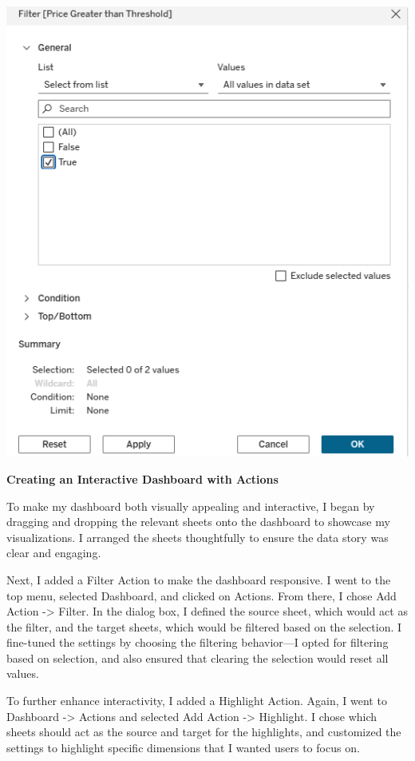 \documentclass[
  letterpaper,
  DIV=11,
  numbers=noendperiod]{scrreprt}
\begin{document}
\includegraphics{Filters_Step2_Shelf_Olufawo.png}

\textbf{Creating an Interactive Dashboard with Actions}

To make my dashboard both visually appealing and interactive, I began by
dragging and dropping the relevant sheets onto the dashboard to showcase
my visualizations. I arranged the sheets thoughtfully to ensure the data
story was clear and engaging.

Next, I added a Filter Action to make the dashboard responsive. I went
to the top menu, selected Dashboard, and clicked on Actions. From there,
I chose Add Action -\textgreater{} Filter. In the dialog box, I defined
the source sheet, which would act as the filter, and the target sheets,
which would be filtered based on the selection. I fine-tuned the
settings by choosing the filtering behavior---I opted for filtering
based on selection, and also ensured that clearing the selection would
reset all values.

To further enhance interactivity, I added a Highlight Action. Again, I
went to Dashboard -\textgreater{} Actions and selected Add Action
-\textgreater{} Highlight. I chose which sheets should act as the source
and target for the highlights, and customized the settings to highlight
specific dimensions that I wanted users to focus on.
\end{document}

